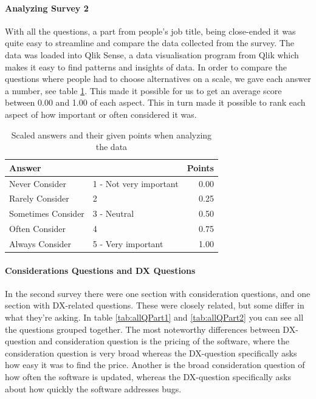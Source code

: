 \documentclass{article}
\begin{document}
\paragraph{Analyzing Survey 2}
With all the questions, a part from people's job title, being close-ended it was quite easy to streamline and compare the data collected from the survey. The data was loaded into Qlik Sense, a data visualisation program from Qlik which makes it easy to find patterns and insights of data. In order to compare the questions where people had to choose alternatives on a scale, we gave each answer a number, see table \ref{tabl:points}.
This made it possible for us to get an average score between 0.00 and 1.00 of each aspect. This in turn made it possible to rank each aspect of how important or often considered it was.
\begin{table}[H]
\centering
\begin{tabular}{l l|r}
\multicolumn{2}{l}{\textbf{Answer}} & \textbf{Points} \\ \hline
Never Consider & 1 - Not very important & 0.00  \\ \hline
Rarely Consider & 2 & 0.25 \\ \hline
Sometimes Consider & 3 - Neutral & 0.50 \\ \hline
Often Consider & 4 & 0.75 \\ \hline
Always Consider & 5 - Very important & 1.00 \\ \hline
\end{tabular}
\caption{Scaled answers and their given points when analyzing the data}
\label{tabl:points}
\end{table}

\paragraph{Considerations Questions and DX Questions}\label{consisQuestions}
In the second survey there were one section with consideration questions, and one section with DX-related questions. These were closely related, but some differ in what they're asking. In table \ref{tab:allQPart1} and \ref{tab:allQPart2} you can see all the questions grouped together. The most noteworthy differences between DX-question and consideration question is the pricing of the software, where the consideration question is very broad whereas the DX-question specifically asks how easy it was to find the price. Another is the broad consideration question of how often the software is updated, whereas the DX-question specifically asks about how quickly the software addresses bugs.
\end{document}
